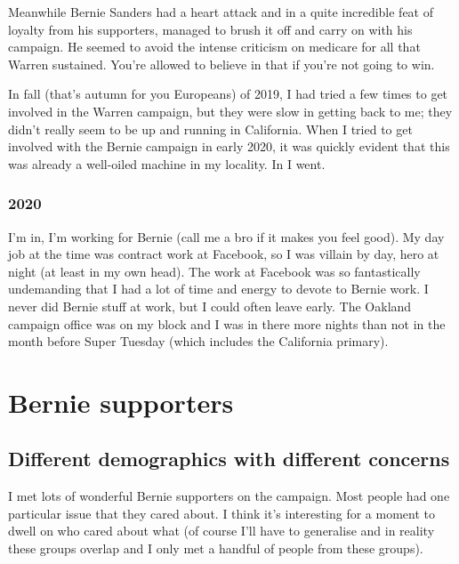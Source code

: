 \documentclass[]{book}
\begin{document}
Meanwhile Bernie Sanders had a heart attack and in a quite incredible feat of loyalty from his supporters, managed to brush it off and carry on with his campaign. He seemed to avoid the intense criticism on medicare for all that Warren sustained. You're allowed to believe in that if you're not going to win.

In fall (that's autumn for you Europeans) of 2019, I had tried a few times to get involved in the Warren campaign, but they were slow in getting back to me; they didn't really seem to be up and running in California. When I tried to get involved with the Bernie campaign in early 2020, it was quickly evident that this was already a well-oiled machine in my locality. In I went.

\hypertarget{section-2}{%
\subsection{2020}\label{section-2}}

I'm in, I'm working for Bernie (call me a bro if it makes you feel good). My day job at the time was contract work at Facebook, so I was villain by day, hero at night (at least in my own head). The work at Facebook was so fantastically undemanding that I had a lot of time and energy to devote to Bernie work. I never did Bernie stuff at work, but I could often leave early. The Oakland campaign office was on my block and I was in there more nights than not in the month before Super Tuesday (which includes the California primary).

\hypertarget{bernie-supporters}{%
\chapter{Bernie supporters}\label{bernie-supporters}}

\hypertarget{different-demographics-with-different-concerns}{%
\section{Different demographics with different concerns}\label{different-demographics-with-different-concerns}}

I met lots of wonderful Bernie supporters on the campaign. Most people had one particular issue that they cared about. I think it's interesting for a moment to dwell on who cared about what (of course I'll have to generalise and in reality these groups overlap and I only met a handful of people from these groups).
\end{document}
